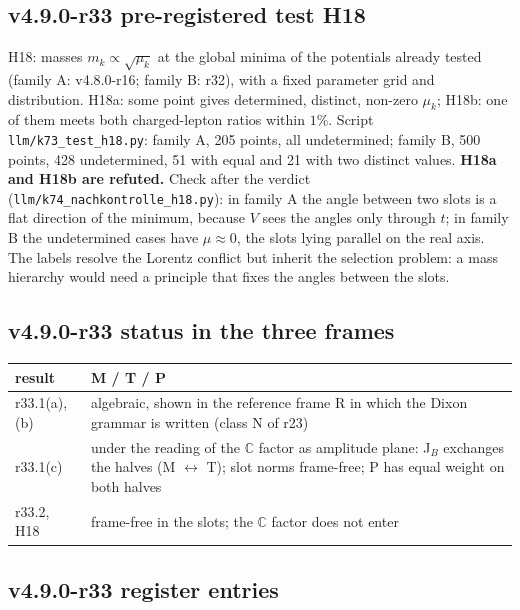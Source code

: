 \subsection*{v4.9.0-r33 pre-registered test H18}
\label{subsec:v490-r33-h18}

H18: masses \(m_k\propto\sqrt{\mu_k}\) at the global minima of the potentials already tested (family A: v4.8.0-r16;
family B: r32), with a fixed parameter grid and distribution.  H18a: some point gives determined, distinct, non-zero
\(\mu_k\); H18b: one of them meets both charged-lepton ratios within \(1\%\).  Script \texttt{llm/k73\_test\_h18.py}: family A,
205 points, all undetermined; family B, 500 points, 428 undetermined, 51 with equal and 21 with two distinct values.
\textbf{H18a and H18b are refuted.}  Check after the verdict (\texttt{llm/k74\_nachkontrolle\_h18.py}): in family A the angle
between two slots is a flat direction of the minimum, because \(V\) sees the angles only through \(t\); in family B the
undetermined cases have \(\mu\approx0\), the slots lying parallel on the real axis.  The labels resolve the Lorentz conflict
but inherit the selection problem: a mass hierarchy would need a principle that fixes the angles between the slots.

\subsection*{v4.9.0-r33 status in the three frames}
\label{subsec:v490-r33-frames}

\begin{center}
\small
\begin{tabular}{@{}>{\raggedright\arraybackslash}p{}>{\raggedright\arraybackslash}p{}@{}}
\toprule
result & M / T / P\\
\midrule
r33.1(a), (b) & algebraic, shown in the reference frame R in which the Dixon grammar is written (class N of r23)\\
r33.1(c) & under the reading of the \(\mathbb C\) factor as amplitude plane: J\(_B\) exchanges the halves (M \(\leftrightarrow\) T); slot norms frame-free; P has equal weight on both halves\\
r33.2, H18 & frame-free in the slots; the \(\mathbb C\) factor does not enter\\
\bottomrule
\end{tabular}
\end{center}

\subsection*{v4.9.0-r33 register entries}
\label{subsec:v490-r33-register}

